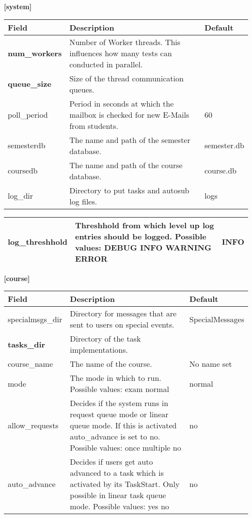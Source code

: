 {\bf [system]}\\
\begin{tabular}{|p{2.5cm}|p{8cm}|p{2.5cm}|}
\hline
{\bf Field} & {\bf Description} & {\bf Default}\\
\hline
\hline
\textbf{num\_workers} & Number of Worker threads. This influences how many tests can conducted
	in parallel. & ~ \\
\hline
\textbf{queue\_size} & Size of the thread communication queues. & ~\\
\hline
poll\_period & Period in seconds at which the mailbox is checked for new E-Mails from students. & 60\\
\hline
semesterdb & The name and path of the semester database. & semester.db\\
\hline
coursedb &  The name and path of the course database. & course.db\\
\hline
log\_dir & Directory to put tasks and autosub log files. & logs  \\
\hline
\end{tabular}
\begin{tabular}{|p{2.5cm}|p{8cm}|p{2.5cm}|}
\hline
log\_threshhold & Threshhold from which level up log entries should be logged.
	Possible values: DEBUG INFO WARNING ERROR & INFO\\
\hline
\end{tabular}

{\bf [course]}\\
\begin{tabular}{|p{2.5cm}|p{8cm}|p{2.5cm}|}
\hline
{\bf Field} & {\bf Description} & {\bf Default}\\
\hline
\hline
specialmsgs\_dir & Directory for messages that are sent to users on special events. &
	SpecialMessages \\
\hline
\textbf{tasks\_dir} & Directory of the task implementations. & ~ \\
\hline
course\_name & The name of the course. & No name set \\
\hline
mode & The mode in which to run. Possible values: exam normal & normal \\
\hline
allow\_requests & Decides if the system runs in request queue mode or linear queue mode. If this is activated
	auto\_advance is set to no. Possible values: once multiple no & no \\
\hline
auto\_advance & Decides if users get auto advanced to a task which is activated by its
	TaskStart. Only possible in linear task queue mode. Possible values: yes no & no \\
\hline
\end{tabular}

